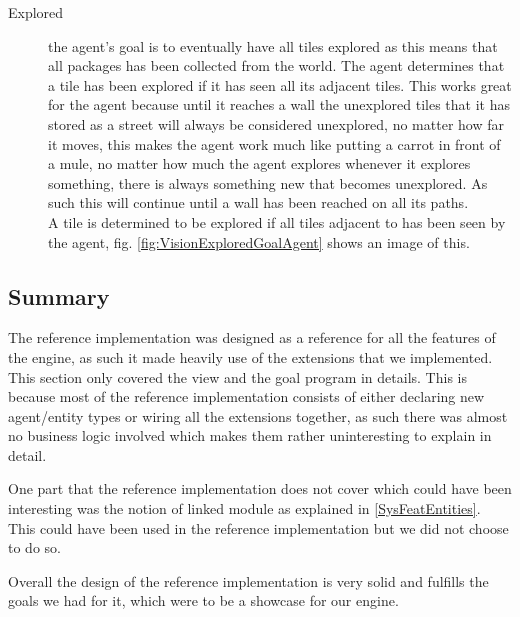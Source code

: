 \begin{description}
\item [{Explored}] the agent\textquoteright{}s goal is to eventually have
all tiles explored as this means that all packages has been collected
from the world. The agent determines that a tile has been explored
if it has seen all its adjacent tiles. This works great for the agent
because until it reaches a wall the unexplored tiles that it has stored
as a street will always be considered unexplored, no matter how far
it moves, this makes the agent work much like putting a carrot in
front of a mule, no matter how much the agent explores whenever it
explores something, there is always something new that becomes unexplored.
As such this will continue until a wall has been reached on all its
paths. \\
A tile is determined to be explored if all tiles adjacent to has been
seen by the agent, fig. \ref{fig:VisionExploredGoalAgent} shows an
image of this.
\end{description}

\subsection*{Summary}

The reference implementation was designed as a reference for all the
features of the engine, as such it made heavily use of the extensions
that we implemented. This section only covered the view and the goal
program in details. This is because most of the reference implementation
consists of either declaring new agent/entity types or wiring all
the extensions together, as such there was almost no business logic
involved which makes them rather uninteresting to explain in detail.

One part that the reference implementation does not cover which could
have been interesting was the notion of linked module as explained
in \ref{SysFeatEntities}. This could have been used in the reference
implementation but we did not choose to do so.

Overall the design of the reference implementation is very solid and
fulfills the goals we had for it, which were to be a showcase for
our engine.

